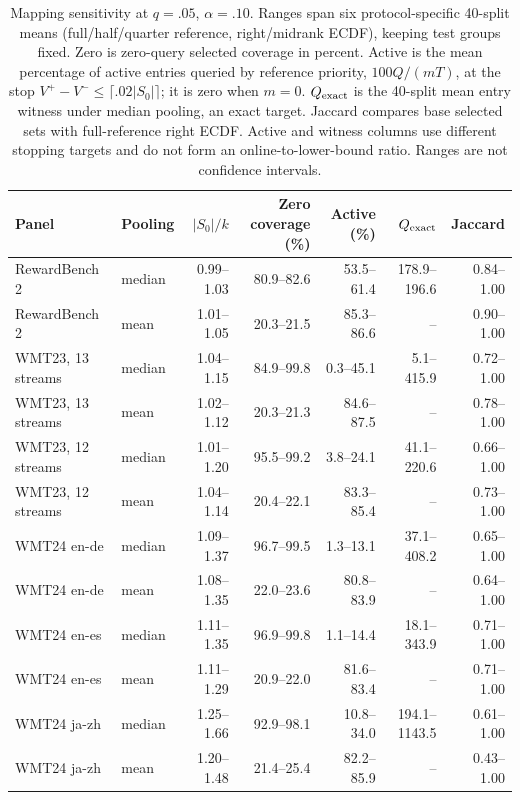 \begin{table}[t]
\centering\small
\begin{tabular}{llrrrrr}
\toprule
Panel & Pooling & $|S_0|/k$ & \shortstack{Zero coverage\\(\%)} & Active (\%) & $Q_{\rm exact}$ & Jaccard \\
\midrule
RewardBench 2 & median & 0.99--1.03 & 80.9--82.6 & 53.5--61.4 & 178.9--196.6 & 0.84--1.00 \\
RewardBench 2 & mean & 1.01--1.05 & 20.3--21.5 & 85.3--86.6 & -- & 0.90--1.00 \\
WMT23, 13 streams & median & 1.04--1.15 & 84.9--99.8 & 0.3--45.1 & 5.1--415.9 & 0.72--1.00 \\
WMT23, 13 streams & mean & 1.02--1.12 & 20.3--21.3 & 84.6--87.5 & -- & 0.78--1.00 \\
WMT23, 12 streams & median & 1.01--1.20 & 95.5--99.2 & 3.8--24.1 & 41.1--220.6 & 0.66--1.00 \\
WMT23, 12 streams & mean & 1.04--1.14 & 20.4--22.1 & 83.3--85.4 & -- & 0.73--1.00 \\
WMT24 en-de & median & 1.09--1.37 & 96.7--99.5 & 1.3--13.1 & 37.1--408.2 & 0.65--1.00 \\
WMT24 en-de & mean & 1.08--1.35 & 22.0--23.6 & 80.8--83.9 & -- & 0.64--1.00 \\
WMT24 en-es & median & 1.11--1.35 & 96.9--99.8 & 1.1--14.4 & 18.1--343.9 & 0.71--1.00 \\
WMT24 en-es & mean & 1.11--1.29 & 20.9--22.0 & 81.6--83.4 & -- & 0.71--1.00 \\
WMT24 ja-zh & median & 1.25--1.66 & 92.9--98.1 & 10.8--34.0 & 194.1--1143.5 & 0.61--1.00 \\
WMT24 ja-zh & mean & 1.20--1.48 & 21.4--25.4 & 82.2--85.9 & -- & 0.43--1.00 \\
\bottomrule
\end{tabular}
\caption{Mapping sensitivity at $q=.05$, $\alpha=.10$. Ranges span six protocol-specific 40-split means (full/half/quarter reference, right/midrank ECDF), keeping test groups fixed. Zero is zero-query selected coverage in percent. Active is the mean percentage of active entries queried by reference priority, $100Q/(mT)$, at the stop $V^+-V^-\le\lceil.02|S_0|\rceil$; it is zero when $m=0$. $Q_{\rm exact}$ is the 40-split mean entry witness under median pooling, an exact target. Jaccard compares base selected sets with full-reference right ECDF. Active and witness columns use different stopping targets and do not form an online-to-lower-bound ratio. Ranges are not confidence intervals.}
\label{tab:mapping-summary}
\end{table}
